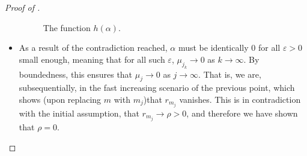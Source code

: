 \documentclass[11pt, a4paper, twoside]{article}
\newcommand{\eps}{\varepsilon}
\numberwithin{equation}{section}
\begin{document}
\begin{proof}[Proof of ]
\begin{itemize}[noitemsep]
\begin{figure}
    			\caption{The function $h(\alpha)$.}
    			\label{h}
    		\end{figure}
    		\item As a result of the contradiction reached, $\alpha$ must be identically $0$ for all $\eps>0$ small enough, meaning that for all such $\eps$, $\mu_{j_k} \longrightarrow 0$ as $k\longrightarrow\infty$. By boundedness, this ensures that $\mu_j\longrightarrow0$ as $j\longrightarrow\infty$. That is, we are, subsequentially, in the fast increasing scenario of the previous point, which shows (upon replacing $m$ with $m_j$)that $r_{m_j}$ vanishes. This is in contradiction with the initial assumption, that $r_{m_j}\longrightarrow \rho>0$, and therefore we have shown that $\rho=0$.
    		\end{itemize}


\end{proof}
\end{document}
